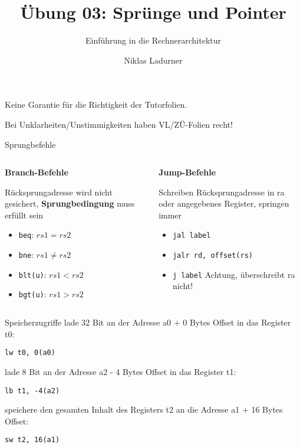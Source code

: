 \documentclass[
  german,            %
  aspectratio=169,    %
]{tumbeamer}
\title{Übung 03: Sprünge und Pointer}
\subtitle{Einführung in die Rechnerarchitektur}
\author{Niklas Ladurner}
\institute{\theChairName\\\theDepartmentName\\\theUniversityName}
\date{\DTMdisplaydate{2024}{11}{1}{-1}}
\begin{document}
\maketitle

\begin{frame}[c]{}{}
  \begin{center}
    \LARGE  Keine Garantie für die Richtigkeit der Tutorfolien.

    \Large Bei Unklarheiten/Unstimmigkeiten haben VL/ZÜ-Folien recht!
  \end{center}
\end{frame}

\begin{frame}[c, fragile]{Sprungbefehle}{}
  \vspace{-1cm}
  \begin{columns}
    \begin{column}{0.5\textwidth}
      \begin{center}\textbf{Branch-Befehle}\end{center}
      Rücksprungadresse wird nicht gesichert, \textbf{Sprungbedingung}
      muss erfüllt sein
      \begin{itemize}
        \item \verb|beq|: $rs1 = rs2$
        \item \verb|bne|: $rs1 \ne rs2$
        \item \verb|blt(u)|: $rs1 < rs2$
        \item \verb|bgt(u)|: $rs1 > rs2$
      \end{itemize}
    \end{column}
    \begin{column}{0.5\textwidth}
      \begin{center}\textbf{Jump-Befehle}\end{center}
      Schreiben Rücksprungadresse in ra oder angegebenes Register,
      springen immer
      \begin{itemize}
        \item \verb|jal label|
        \item \verb|jalr rd, offset(rs)|
        \item \verb|j label| Achtung, überschreibt ra nicht!
      \end{itemize}
    \end{column}
  \end{columns}
\end{frame}

\begin{frame}[c, fragile]{Speicherzugriffe}{}
  lade 32 Bit an der Adresse a0 + 0 Bytes Offset in das Register t0:
  \begin{verbatim}lw t0, 0(a0)\end{verbatim}
  lade 8 Bit an der Adresse a2 - 4 Bytes Offset in das Register t1:
  \begin{verbatim}lb t1, -4(a2)\end{verbatim}
  speichere den gesamten Inhalt des Registers t2 an die Adresse a1 + 16 Bytes Offset:
  \begin{verbatim}sw t2, 16(a1)\end{verbatim}
\end{frame}
\end{document}
